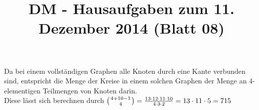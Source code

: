 \documentclass[fleqn]{article}
\title{DM - Hausaufgaben zum 11. Dezember 2014 (Blatt 08)}
\author{}
\date{\gertoday}
\newcommand*{\bfrac}[2]{\genfrac{}{}{0pt}{}{#1}{#2}}
\begin{document}
\maketitle

\section{}
Da bei einem vollständigen Graphen alle Knoten durch eine Kante verbunden sind, entspricht die Menge der Kreise in einem solchen Graphen der Menge an 4-elementigen Teilmengen von Knoten darin.\\
Diese lässt sich berechnen durch $\left( \bfrac{4+10-1}{4}\right) = \frac{13 \cdot 12 \cdot 11 \cdot 10}{4 \cdot 3 \cdot 2 } = 13 \cdot 11 \cdot 5 = 715$

\section{}
\end{document}
